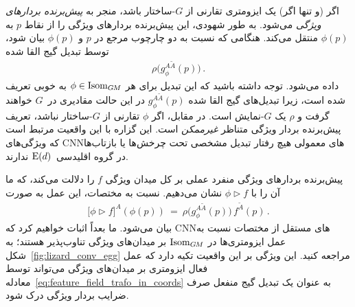 اگر (و تنها اگر) یک ایزومتری تقارنی از $G$-ساختار باشد، منجر به \emph{پیش‌برنده بردارهای ویژگی} می‌شود.
به طور شهودی، این پیش‌برنده بردارهای ویژگی را از نقاط $p$ به $\phi(p)$ منتقل می‌کند.
هنگامی که نسبت به دو چارچوب مرجع در $p$ و $\phi(p)$ بیان شود، توسط تبدیل گیج القا شده
\begin{align}
	\rho\big( g_\phi^{A\widetilde{A}}(p) \big) \,.
\end{align}
داده می‌شود.
توجه داشته باشید که این تبدیل برای هر $\phi \in \operatorname{Isom}_{G\mkern-1.4muM}$ به خوبی تعریف شده است، زیرا تبدیل‌های گیج القا شده $g_\phi^{A\widetilde{A}}(p)$ در این حالت مقادیری در~$G$ خواهند گرفت و $\rho$ یک $G$-نمایش است.
در مقابل، اگر $\phi$ تقارنی از $G$-ساختار نباشد، تعریف پیش‌برنده بردار ویژگی متناظر \emph{غیرممکن} است.
این گزاره با این واقعیت مرتبط است که ویژگی‌های CNNهای معمولی هیچ رفتار تبدیل مشخصی تحت چرخش‌ها یا بازتاب‌ها در گروه اقلیدسی~$\operatorname{E}(d)$ ندارند.


پیش‌برنده بردارهای ویژگی منفرد عملی بر کل میدان ویژگی $f$ را دلالت می‌کند، که ما آن را با $\phi \rhd f$ نشان می‌دهیم.
نسبت به مختصات، این عمل به صورت
\begin{align}\label{eq:feature_field_trafo_in_coords}
	\big[\phi \rhd f\big]^A(\phi(p)) \ =\ \rho\big( g_\phi^{A\widetilde{A}}(p)\big)\, f^{\widetilde{A}}(p) \,.
\end{align}
بیان می‌شود.
ما بعداً اثبات خواهیم کرد که CNNهای مستقل از مختصات نسبت به عمل ایزومتری‌ها در $\operatorname{Isom}_{G\mkern-1.4muM}$ بر میدان‌های ویژگی تناوب‌پذیر هستند؛ به شکل~\ref{fig:lizard_conv_egg} مراجعه کنید.
این ویژگی بر این واقعیت تکیه دارد که عمل فعال ایزومتری بر میدان‌های ویژگی می‌تواند توسط معادله~\eqref{eq:feature_field_trafo_in_coords} به عنوان یک تبدیل گیج منفعل صرف ضرایب بردار ویژگی درک شود.